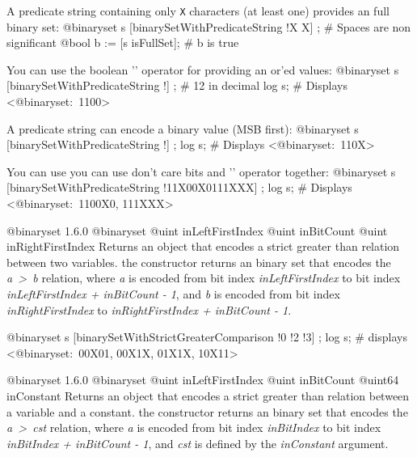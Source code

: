 \exempleDeuxLignes
{A predicate string containing only \texttt{\textquotesingle X\textquotesingle} characters (at least one) provides an full binary set:}
{@binaryset s [binarySetWithPredicateString !\textquotedbl X X\textquotedbl] ; \# Spaces are non significant}
{@bool b := [s isFullSet]; \# b is true}


\exempleDeuxLignes
{You can use the boolean '\textbar' operator for providing an or'ed values:}
{@binaryset s [binarySetWithPredicateString !\textquotedbl] ; \# 12 in decimal}
{log s; \# Displays <@binaryset:~1100>}


\exempleDeuxLignes
{A predicate string can encode a binary value (MSB first):}
{@binaryset s [binarySetWithPredicateString !\textquotedbl] ;}
{log s; \# Displays <@binaryset:~110X>}



\exempleDeuxLignes
{You can use you can use don't care bits and '\textbar' operator together:}
{@binaryset s [binarySetWithPredicateString !\textquotedbl 11X00X0\textbar 111XXX\textquotedbl] ;}
{log s; \# Displays <@binaryset:~1100X0, 111XXX>}





{@binaryset}
{1.6.0}
{@binaryset}
{@uint inLeftFirstIndex}
{@uint inBitCount}
{@uint inRightFirstIndex}
{Returns an  object that encodes a strict greater than relation between two variables.}
{the constructor returns an binary set that encodes the \emph{a~>~b} relation, where \emph{a} is encoded from bit index \emph{inLeftFirstIndex} to bit index \emph{inLeftFirstIndex  + inBitCount - 1}, and \emph{b} is encoded from bit index \emph{inRightFirstIndex} to \emph{inRightFirstIndex + inBitCount - 1}.}

\exempleDeuxLignes
{}
{@binaryset s [binarySetWithStrictGreaterComparison !0 !2 !3] ;}
{log s; \# displays <@binaryset:~00X01, 00X1X, 01X1X, 10X11>}





{@binaryset}
{1.6.0}
{@binaryset}
{@uint inLeftFirstIndex}
{@uint inBitCount}
{@uint64 inConstant}
{Returns an  object that encodes a strict greater than relation between a variable and a constant.}
{the constructor returns an binary set that encodes the \emph{a~>~cst} relation, where \emph {a} is encoded from bit index \emph{inBitIndex} to bit index \emph{inBitIndex  + inBitCount - 1}, and \emph{cst} is defined by the \emph{inConstant} argument.}





